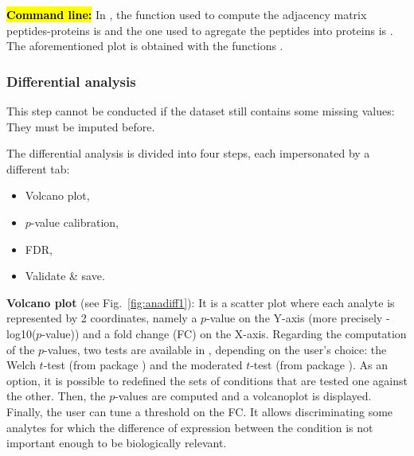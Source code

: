 \documentclass[12pt]{article}
\begin{document}
{\hl{\bf Command line:} In , the function used to compute the 
adjacency matrix peptides-proteins is  and 
the one used to agregate the peptides into proteins is 
. The aforementioned plot is obtained with the 
functions .



\subsubsection{Differential analysis}\label{diffana}

This step cannot be conducted if the dataset still contains some missing 
values: They must be imputed before.

{The differential analysis is divided into four steps, each impersonated by a 
different tab:
\begin{itemize}
\item Volcano plot,
\item $p$-value calibration,
\item FDR,
\item Validate \& save.
\end{itemize}}


\textbf {Volcano plot} (see Fig.~\ref{fig:anadiff1}): It is a scatter plot 
where each analyte is represented by 2 coordinates, namely a $p$-value on the 
Y-axis (more precisely -log10($p$-value)) and a fold change (FC) on the 
X-axis. Regarding the computation of the $p$-values, two tests are available 
in , depending on the user's choice: the Welch $t$-test 
(from package ) and the moderated $t$-test (from package 
).
As an option, it is possible to redefined the sets of conditions that are 
tested one against the other. 
Then, the $p$-values are computed and a volcanoplot is displayed. 
Finally, the user can tune a threshold on the FC. It allows discriminating 
some analytes for which the difference of expression between the condition is 
not important enough to be biologically relevant.

}
\end{document}
